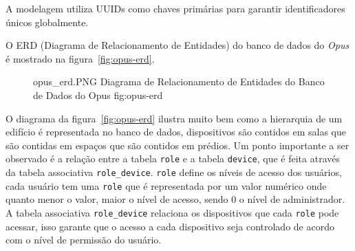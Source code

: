A modelagem utiliza UUIDs como chaves primárias para garantir identificadores únicos globalmente.

O ERD (Diagrama de Relacionamento de Entidades) do banco de dados do \emph{Opus} é mostrado na figura~\ref{fig:opus-erd}.
\begin{figure}[H]
    {opus_erd.PNG}
    {Diagrama de Relacionamento de Entidades do Banco de Dados do Opus}
    {fig:opus-erd}
\end{figure}
O diagrama da figura~\ref{fig:opus-erd} ilustra muito bem como a hierarquia de um edifício é representada no banco de dados,
dispositivos são contidos em salas que são contidas em espaços que são contidos em prédios.
Um ponto importante a ser observado é a relação entre a tabela \texttt{role} e a tabela \texttt{device},
que é feita através da tabela associativa \texttt{role\_device}. \texttt{role} define os níveis de acesso dos usuários,
cada usuário tem uma \texttt{role} que é representada por um valor numérico onde quanto menor o valor, maior o nível de acesso,
sendo 0 o nível de administrador. A tabela associativa \texttt{role\_device} relaciona os dispositivos que cada \texttt{role}
pode acessar, isso garante que o acesso a cada dispositivo seja controlado de acordo com o nível de permissão do usuário.

